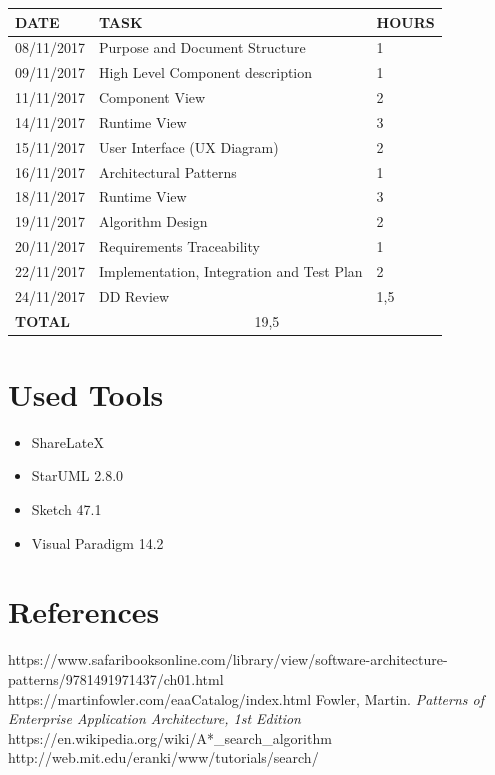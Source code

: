 \documentclass[12pt]{article}
\begin{document}
\begin{center}
\begin{tabular}{ |p{}|p{}|p{}| } 
 \hline
 \textbf{DATE} & \textbf{TASK} & \textbf{HOURS} \\ 
  \hline
 08/11/2017 & Purpose and Document Structure & 1 \\ 
  \hline
  09/11/2017 & High Level Component description & 1 \\ 
  \hline
  11/11/2017 & Component View & 2 \\ 
  \hline
  14/11/2017 & Runtime View & 3 \\ 
  \hline
  15/11/2017 & User Interface (UX Diagram) & 2 \\ 
  \hline
  16/11/2017 & Architectural Patterns & 1 \\
  \hline
  18/11/2017 & Runtime View & 3 \\
  \hline
  19/11/2017 & Algorithm Design & 2 \\
  \hline
  20/11/2017 & Requirements Traceability & 1 \\
  \hline
  22/11/2017 & Implementation, Integration and Test Plan & 2 \\
  \hline
  24/11/2017 & DD Review & 1,5 \\
  \hline
  \textbf{TOTAL} & \multicolumn{2}{c|}{19,5} \\ 
  \hline
\end{tabular}
\end{center}


\section{Used Tools}
\begin{itemize}
    \item ShareLateX
    \item StarUML 2.8.0
    \item Sketch 47.1
    \item Visual Paradigm 14.2
\end{itemize}

\section{References}

\begin{thebibliography}{9}
https://www.safaribooksonline.com/library/view/software-architecture-patterns/9781491971437/ch01.html
https://martinfowler.com/eaaCatalog/index.html
Fowler, Martin. \textit{Patterns of Enterprise Application Architecture, 1st Edition}
https://en.wikipedia.org/wiki/A*\_search\_algorithm
http://web.mit.edu/eranki/www/tutorials/search/

\end{thebibliography}
\end{document}
